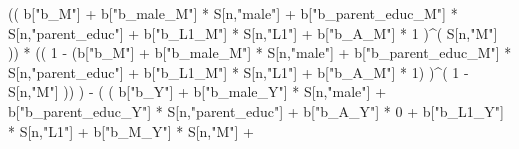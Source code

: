 \documentclass[
]{book}
\newenvironment{Shaded}{\begin{snugshade}}{\end{snugshade}}
\newcommand{\DecValTok}[1]{\textcolor[rgb]{0.00,0.00,0.81}{#1}}
\newcommand{\NormalTok}[1]{#1}
\newcommand{\SpecialCharTok}[1]{\textcolor[rgb]{0.00,0.00,0.00}{#1}}
\newcommand{\StringTok}[1]{\textcolor[rgb]{0.31,0.60,0.02}{#1}}
\begin{document}
\begin{Shaded}
\begin{Highlighting}[]
\NormalTok{                    (( b[}\StringTok{"b\_M"}\NormalTok{] }\SpecialCharTok{+} 
\NormalTok{                           b[}\StringTok{"b\_male\_M"}\NormalTok{] }\SpecialCharTok{*}\NormalTok{ S[n,}\StringTok{"male"}\NormalTok{] }\SpecialCharTok{+} 
\NormalTok{                           b[}\StringTok{"b\_parent\_educ\_M"}\NormalTok{] }\SpecialCharTok{*}\NormalTok{ S[n,}\StringTok{"parent\_educ"}\NormalTok{] }\SpecialCharTok{+} 
\NormalTok{                           b[}\StringTok{"b\_L1\_M"}\NormalTok{] }\SpecialCharTok{*}\NormalTok{ S[n,}\StringTok{"L1"}\NormalTok{] }\SpecialCharTok{+}
\NormalTok{                           b[}\StringTok{"b\_A\_M"}\NormalTok{] }\SpecialCharTok{*} \DecValTok{1}\NormalTok{ )}\SpecialCharTok{\^{}}\NormalTok{( S[n,}\StringTok{"M"}\NormalTok{] )) }\SpecialCharTok{*}
\NormalTok{                    (( }\DecValTok{1} \SpecialCharTok{{-}}\NormalTok{ (b[}\StringTok{"b\_M"}\NormalTok{] }\SpecialCharTok{+} 
\NormalTok{                              b[}\StringTok{"b\_male\_M"}\NormalTok{] }\SpecialCharTok{*}\NormalTok{ S[n,}\StringTok{"male"}\NormalTok{] }\SpecialCharTok{+} 
\NormalTok{                              b[}\StringTok{"b\_parent\_educ\_M"}\NormalTok{] }\SpecialCharTok{*}\NormalTok{ S[n,}\StringTok{"parent\_educ"}\NormalTok{] }\SpecialCharTok{+} 
\NormalTok{                              b[}\StringTok{"b\_L1\_M"}\NormalTok{] }\SpecialCharTok{*}\NormalTok{ S[n,}\StringTok{"L1"}\NormalTok{] }\SpecialCharTok{+}
\NormalTok{                              b[}\StringTok{"b\_A\_M"}\NormalTok{] }\SpecialCharTok{*} \DecValTok{1}\NormalTok{) )}\SpecialCharTok{\^{}}\NormalTok{( }\DecValTok{1} \SpecialCharTok{{-}}\NormalTok{ S[n,}\StringTok{"M"}\NormalTok{] )) ) }\SpecialCharTok{{-}} 
\NormalTok{                    ( ( b[}\StringTok{"b\_Y"}\NormalTok{] }\SpecialCharTok{+} 
\NormalTok{                          b[}\StringTok{"b\_male\_Y"}\NormalTok{] }\SpecialCharTok{*}\NormalTok{ S[n,}\StringTok{"male"}\NormalTok{] }\SpecialCharTok{+} 
\NormalTok{                          b[}\StringTok{"b\_parent\_educ\_Y"}\NormalTok{] }\SpecialCharTok{*}\NormalTok{ S[n,}\StringTok{"parent\_educ"}\NormalTok{] }\SpecialCharTok{+} 
\NormalTok{                          b[}\StringTok{"b\_A\_Y"}\NormalTok{] }\SpecialCharTok{*} \DecValTok{0} \SpecialCharTok{+} 
\NormalTok{                          b[}\StringTok{"b\_L1\_Y"}\NormalTok{] }\SpecialCharTok{*}\NormalTok{ S[n,}\StringTok{"L1"}\NormalTok{] }\SpecialCharTok{+}
\NormalTok{                          b[}\StringTok{"b\_M\_Y"}\NormalTok{] }\SpecialCharTok{*}\NormalTok{ S[n,}\StringTok{"M"}\NormalTok{] }\SpecialCharTok{+}

\end{Highlighting}
\end{Shaded}
\end{document}
